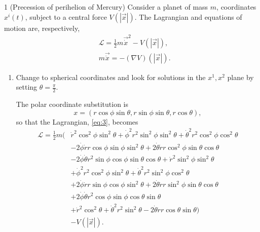 \documentclass[11pt]{article}
\begin{document}
\begin{problem}{1 (Precession of perihelion of Mercury)}
	Consider a planet of mass \( m \), coordinates \( x^i(t) \), subject to a central force \( V(\left| \vec{x} \right|) \).
	The Lagrangian and equations of motion are, respectively,
	\begin{align}
		\label{eq:3}
		 & \mathcal{L} = \frac{1}{2}m \vec{\dot{x}}^2 - V(\left| \vec{x} \right|), \\
		 & m \vec{\ddot{x}} = -(\nabla V)(\left| \vec{x} \right|).
	\end{align}
	\begin{enumerate}[label=(\alph*)]
		\item Change to spherical coordinates and look for solutions in the \( x^1, x^2 \) plane by setting \(\theta = \frac{\pi}{2}\).
		      \begin{answer}
			      The polar coordinate substitution is
			      \begin{equation}
				      \label{eq:18}
				      x = (r\cos\phi\sin\theta, r\sin\phi\sin\theta, r\cos\theta),
			      \end{equation}
			      so that the Lagrangian, \cref{eq:3}, becomes
			      \begin{equation}
				      \label{eq:19}
				      \begin{aligned}
					      \mathcal{L} = \frac{1}{2} m \biggl( & \dot{r}^2\cos^2\phi\sin^2\theta + \dot{\phi}^2 r^2\sin^2\phi\sin^2\theta + \dot{\theta}^2 r^2 \cos^2\phi\cos^2\theta  \\
					                                          & - 2 \dot{\phi} \dot{r} r \cos\phi \sin \phi \sin^2\theta + 2 \dot{\theta} \dot{r} r \cos^2\phi\sin \theta \cos \theta \\
					                                          & - 2 \dot{\phi} \dot{\theta} r^2 \sin\phi \cos \phi \sin \theta \cos \theta + \dot{r}^2 \sin^2\phi \sin^2\theta        \\
					                                          & + \dot{\phi}^2 r^2 \cos^2\phi \sin^2 \theta + \dot{\theta}^2 r^2 \sin^2 \phi \cos^2\theta                             \\
					                                          & + 2 \dot{\phi} \dot{r} r \sin\phi\cos\phi \sin^2\theta + 2 \dot{\theta} \dot{r} r \sin^2 \phi \sin \theta \cos \theta \\
					                                          & + 2 \dot{\phi} \dot{\theta} r^2 \cos \phi \sin \phi \cos \theta \sin \theta                                           \\
					                                          & + \dot{r}^2\cos^2 \theta + \dot{\theta}^2 r^2 \sin^2 \theta - 2 \dot{\theta} \dot{r} r \cos\theta \sin \theta \biggr) \\
					                                          & - V(\left| \vec{x} \right|).
				      \end{aligned}
			      \end{equation}


\end{answer}
\end{enumerate}
\end{problem}
\end{document}
